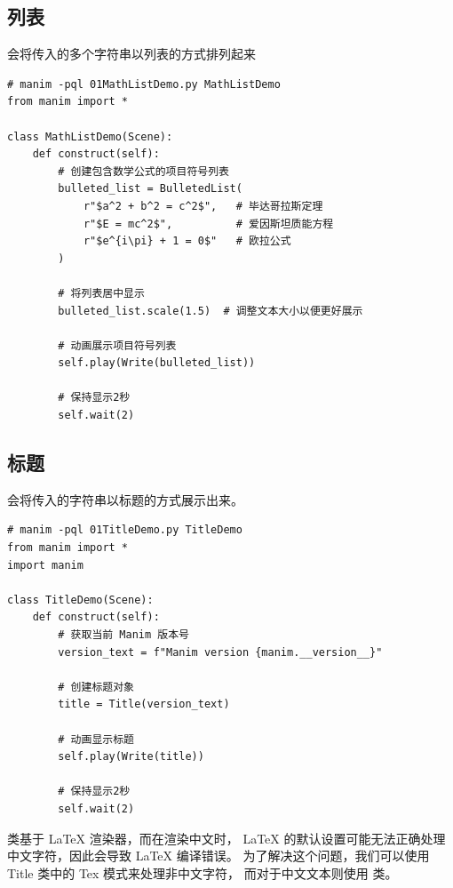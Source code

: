 \subsection{列表}
\label{subsec:manim_text_formula_formula_list}
会将传入的多个字符串以列表的方式排列起来

\begin{lstlisting}[style=pythonstyle]
# manim -pql 01MathListDemo.py MathListDemo   
from manim import *

class MathListDemo(Scene):
    def construct(self):
        # 创建包含数学公式的项目符号列表
        bulleted_list = BulletedList(
            r"$a^2 + b^2 = c^2$",   # 毕达哥拉斯定理
            r"$E = mc^2$",          # 爱因斯坦质能方程
            r"$e^{i\pi} + 1 = 0$"   # 欧拉公式
        )

        # 将列表居中显示
        bulleted_list.scale(1.5)  # 调整文本大小以便更好展示

        # 动画展示项目符号列表
        self.play(Write(bulleted_list))

        # 保持显示2秒
        self.wait(2)
\end{lstlisting}

\subsection{标题}
\label{subsec:manim_text_formula_formula_title}
 会将传入的字符串以标题的方式展示出来。

\begin{lstlisting}[style=pythonstyle]
# manim -pql 01TitleDemo.py TitleDemo   
from manim import *
import manim

class TitleDemo(Scene):
    def construct(self):
        # 获取当前 Manim 版本号
        version_text = f"Manim version {manim.__version__}"

        # 创建标题对象
        title = Title(version_text)

        # 动画显示标题
        self.play(Write(title))

        # 保持显示2秒
        self.wait(2)
\end{lstlisting} 

 类基于 LaTeX 渲染器，而在渲染中文时，
LaTeX 的默认设置可能无法正确处理中文字符，因此会导致 LaTeX 编译错误。
为了解决这个问题，我们可以使用 Title 类中的 Tex 模式来处理非中文字符，
而对于中文文本则使用  类。


